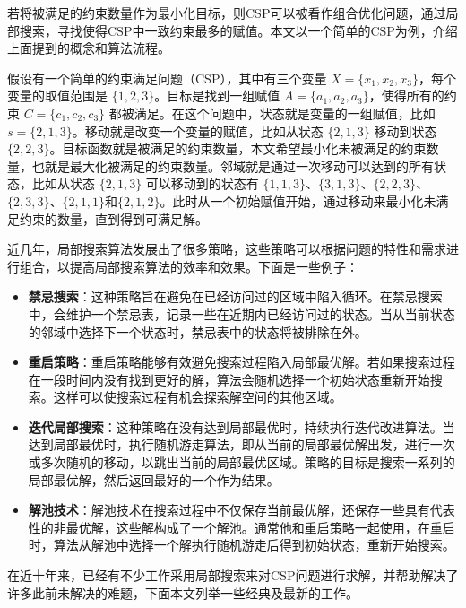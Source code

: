 若将被满足的约束数量作为最小化目标，则CSP可以被看作组合优化问题，通过局部搜索，寻找使得CSP中一致约束最多的赋值。本文以一个简单的CSP为例，介绍上面提到的概念和算法流程。

\begin{example}
假设有一个简单的约束满足问题（CSP），其中有三个变量 $X = \{x_1, x_2, x_3\}$，每个变量的取值范围是 $\{1, 2, 3\}$。目标是找到一组赋值 $A = \{a_1, a_2, a_3\}$，使得所有的约束 $C = \{c_1, c_2, c_3\}$ 都被满足。在这个问题中，状态就是变量的一组赋值，比如 $s = \{2, 1, 3\}$。移动就是改变一个变量的赋值，比如从状态 $\{2, 1, 3\}$ 移动到状态 $\{2, 2, 3\}$。目标函数就是被满足的约束数量，本文希望最小化未被满足的约束数量，也就是最大化被满足的约束数量。邻域就是通过一次移动可以达到的所有状态，比如从状态 $\{2, 1, 3\}$ 可以移动到的状态有 $\{1, 1, 3\}$、$\{3, 1, 3\}$、$\{2, 2, 3\}$、$\{2, 3, 3\}$、$\{2, 1, 1\}$和$\{2, 1, 2\}$。此时从一个初始赋值开始，通过移动来最小化未满足约束的数量，直到得到可满足解。
\end{example}

近几年，局部搜索算法发展出了很多策略，这些策略可以根据问题的特性和需求进行组合，以提高局部搜索算法的效率和效果。下面是一些例子：
\begin{itemize}
    \item \textbf{禁忌搜索\cite{glover1990tabu}}：这种策略旨在避免在已经访问过的区域中陷入循环。在禁忌搜索中，会维护一个禁忌表，记录一些在近期内已经访问过的状态。当从当前状态的邻域中选择下一个状态时，禁忌表中的状态将被排除在外。
    \item \textbf{重启策略}：重启策略能够有效避免搜索过程陷入局部最优解。若如果搜索过程在一段时间内没有找到更好的解，算法会随机选择一个初始状态重新开始搜索。这样可以使搜索过程有机会探索解空间的其他区域。 
    \item \textbf{迭代局部搜索\cite{lourencco2003iterated}}：这种策略在没有达到局部最优时，持续执行迭代改进算法。当达到局部最优时，执行随机游走算法，即从当前的局部最优解出发，进行一次或多次随机的移动，以跳出当前的局部最优区域。策略的目标是搜索一系列的局部最优解，然后返回最好的一个作为结果。
    \item \textbf{解池技术}：解池技术在搜索过程中不仅保存当前最优解，还保存一些具有代表性的非最优解，这些解构成了一个解池。通常他和重启策略一起使用，在重启时，算法从解池中选择一个解执行随机游走后得到初始状态，重新开始搜索。
\end{itemize}

在近十年来，已经有不少工作采用局部搜索来对CSP问题进行求解，并帮助解决了许多此前未解决的难题，下面本文列举一些经典及最新的工作。

